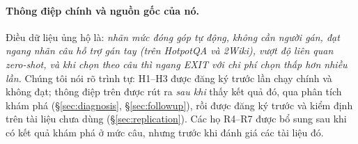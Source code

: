 \documentclass[11pt]{article}
\begin{document}
\paragraph{Thông điệp chính và nguồn gốc của nó.} Điều dữ liệu ủng hộ là: \emph{nhãn mức đóng góp tự động, không cần
người gán, đạt ngang nhãn câu hỗ trợ gán tay (trên HotpotQA và 2Wiki), vượt độ liên quan zero-shot, và khi chọn theo
câu thì ngang EXIT với chi phí chọn thấp hơn nhiều lần.} Chúng tôi nói rõ trình tự: H1--H3 được đăng ký trước lần chạy
chính và không đạt; thông điệp trên được rút ra \emph{sau khi} thấy kết quả đó, qua phân tích khám phá
(\S\ref{sec:diagnosis}, \S\ref{sec:followup}), rồi được đăng ký trước và kiểm định trên tài liệu chưa dùng
(\S\ref{sec:replication}). Các họ R4--R7 được bổ sung sau khi có kết quả khám phá ở mức câu, nhưng trước khi đánh giá
các tài liệu đó.
\end{document}
